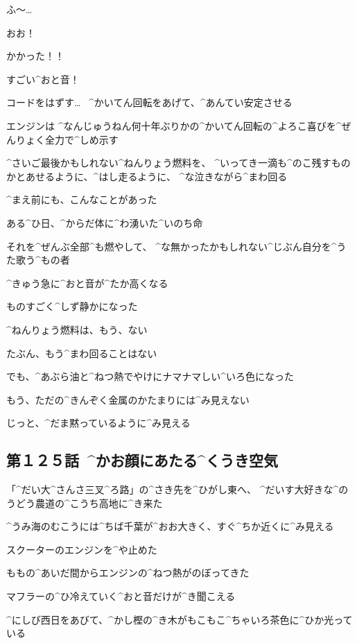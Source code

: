 \A ふ〜…

\page
\A おお！

\A かかった！！

\A すごい^{おと}{音}！

\A コードをはずす…
\ ^{かいてん}{回転}をあげて、^{あんてい}{安定}させる

\page[60]
\A エンジンは
^{なんじゅうねん}{何十年}ぶりかの^{かいてん}{回転}の^{よろこ}{喜}びを^{ぜんりょく}{全力}で^{しめ}{示}す

\A ^{さいご}{最後}かもしれない^{ねんりょう}{燃料}を、
^{いってき}{一滴}も^{のこ}{残}すものかとあせるように、^{はし}{走}るように、
^{な}{泣}きながら^{まわ}{回}る

\page
\A ^{まえ}{前}にも、こんなことがあった

\A ある^{ひ}{日}、^{からだ}{体}に^{わ}{湧}いた^{いのち}{命}

\A それを^{ぜんぶ}{全部}^{も}{燃}やして、
^{な}{無}かったかもしれない^{じぶん}{自分}を^{うた}{歌}う^{もの}{者}

\page[63]
\A ^{きゅう}{急}に^{おと}{音}が^{たか}{高}くなる

\page[65]
\A ものすごく^{しず}{静}かになった

\A ^{ねんりょう}{燃料}は、もう、ない

\A たぶん、もう^{まわ}{回}ることはない

\page
\A でも、^{あぶら}{油}と^{ねつ}{熱}でやけにナマナマしい^{いろ}{色}になった

\A もう、ただの^{きんぞく}{金属}のかたまりには^{み}{見}えない

\A じっと、^{だま}{黙}っているように^{み}{見}える


\subsection{第１２５話\ ^{かお}{顔}にあたる^{くうき}{空気}}

\page[69]
\A 「^{だい}{大}^{さんさ}{三叉}^{ろ}{路}」の^{さき}{先}を^{ひがし}{東}へ、
^{だいす}{大好}きな^{のうどう}{農道}の^{こうち}{高地}に^{き}{来}た

\page
\A ^{うみ}{海}のむこうには^{ちば}{千葉}が^{おお}{大}きく、すぐ^{ちか}{近}くに^{み}{見}える

\A スクーターのエンジンを^{や}{止}めた

\A ももの^{あいだ}{間}からエンジンの^{ねつ}{熱}がのぼってきた

\page
\A マフラーの^{ひ}{冷}えていく^{おと}{音}だけが^{き}{聞}こえる

\A ^{にしび}{西日}をあびて、^{かし}{樫}の^{き}{木}がもこもこ^{ちゃいろ}{茶色}に^{ひか}{光}っている

